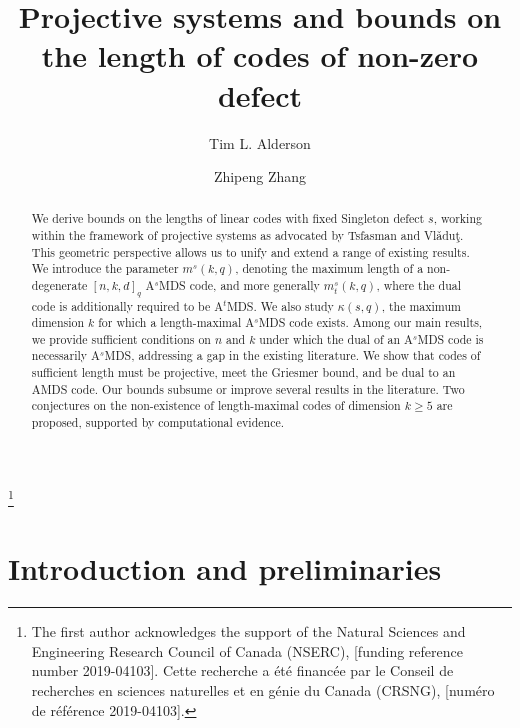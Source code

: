 \documentclass[11pt,a4paper]{amsart}
\theoremstyle{plain}
\theoremstyle{definition}
\theoremstyle{remark}
\begin{document}
	\title[Bounds on the length of codes of non-zero defect]{Projective systems and bounds on the length of codes of non-zero defect}

\author{Tim L. Alderson}
\address{Mathematics and Statistics, University of New Brunswick, Saint John, New Brunswick, E2L 4L5, Canada}
\thanks{The first author acknowledges the support of the Natural Sciences and Engineering Research Council of Canada (NSERC), [funding reference number 2019-04103]. Cette recherche a \'{e}t\'{e} financ\'{e}e par le Conseil de recherches en sciences naturelles et en g\'{e}nie du Canada (CRSNG), [num\'{e}ro de r\'{e}f\'{e}rence 2019-04103].}

\author{Zhipeng Zhang}
\address{Mathematics and Statistics, University of New Brunswick, Saint John, New Brunswick, E2L 4L5, Canada}

\date{}

	\begin{abstract}
		We derive bounds on the lengths of linear codes with fixed Singleton defect $s$, working within the framework of projective systems as advocated by Tsfasman and Vl\v{a}du\c{t}. This geometric perspective allows us to unify and extend a range of existing results. We introduce the parameter $m^s(k,q)$, denoting the maximum length of a non-degenerate $[n,k,d]_q$ A$^s$MDS code, and more generally $m^s_t(k,q)$, where the dual code is additionally required to be A$^t$MDS. We also study $\kappa(s,q)$, the maximum dimension $k$ for which a length-maximal A$^s$MDS code exists. Among our main results, we provide sufficient conditions on $n$ and $k$ under which the dual of an A$^s$MDS code is necessarily A$^s$MDS, addressing a gap in the existing literature. We show that codes of sufficient length must be projective, meet the Griesmer bound, and be dual to an AMDS code. Our bounds subsume or improve several results in the literature. Two conjectures on the non-existence of length-maximal codes of dimension $k\ge 5$ are proposed, supported by computational evidence.
	\end{abstract}

	\maketitle

	\section{Introduction and preliminaries} \label{sec: Intro}
\end{document}
